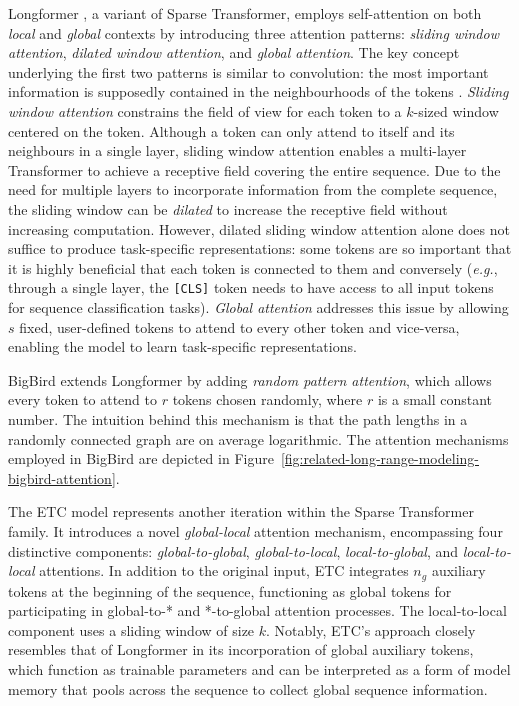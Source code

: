 Longformer \citep{beltagy2020longformer}, a variant of Sparse Transformer, employs self-attention on both \textit{local} and \textit{global} contexts by introducing three attention patterns: \textit{sliding window attention}, \textit{dilated window attention}, and \textit{global attention}. The key concept underlying the first two patterns is similar to convolution: the most important information is supposedly contained in the neighbourhoods of the tokens \citep{liu2022leveraging}. \textit{Sliding window attention} constrains the field of view for each token to a $k$-sized window centered on the token. Although a token can only attend to itself and its neighbours in a single layer, sliding window attention enables a multi-layer Transformer to achieve a receptive field covering the entire sequence. Due to the need for multiple layers to incorporate information from the complete sequence, the sliding window can be \textit{dilated} to increase the receptive field without increasing computation. However, dilated sliding window attention alone does not suffice to produce task-specific representations: some tokens are so important that it is highly beneficial that each token is connected to them and conversely (\textit{e.g.}, through a single layer, the \texttt{[CLS]} token needs to have access to all input tokens for sequence classification tasks). \textit{Global attention} addresses this issue by allowing $s$ fixed, user-defined tokens to attend to every other token and vice-versa, enabling the model to learn task-specific representations. 

BigBird \citep{zaheer2020big} extends Longformer by adding \textit{random pattern attention}, which allows every token to attend to $r$ tokens chosen randomly, where $r$ is a small constant number. The intuition behind this mechanism is that the path lengths in a randomly connected graph are on average logarithmic. The attention mechanisms employed in BigBird are depicted in Figure~\ref{fig:related-long-range-modeling-bigbird-attention}.

The \ac{ETC} model \citep{ainslie2020etc} represents another iteration within the Sparse Transformer family. It introduces a novel \textit{global-local} attention mechanism, encompassing four distinctive components: \textit{global-to-global}, \textit{global-to-local}, \textit{local-to-global}, and \textit{local-to-local} attentions. In addition to the original input, \ac{ETC} integrates $n_g$ auxiliary tokens at the beginning of the sequence, functioning as global tokens for participating in global-to-* and *-to-global attention processes. The local-to-local component uses a sliding window of size $k$. Notably, \ac{ETC}'s approach closely resembles that of Longformer in its incorporation of global auxiliary tokens, which function as trainable parameters and can be interpreted as a form of model memory that pools across the sequence to collect global sequence information. 


